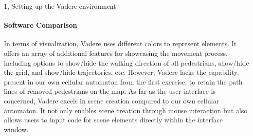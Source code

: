 \begin{task}{1, Setting up the Vadere environment}
\paragraph{Software Comparison}
In terms of visualization, Vadere uses different colors to represent elements. It offers an array of additional features for showcasing the movement process, including options to show/hide the walking direction of all pedestrians, show/hide the grid, and show/hide trajectories, etc. However, Vadere lacks the capability, present in our own cellular automaton from the first exercise, to retain the path lines of removed pedestrians on the map.
As far as the user interface is concerned, Vadere excels in scene creation compared to our own cellular automaton. It not only enables scene creation through mouse interaction but also allows users to input code for scene elements directly within the interface window.
\end{task}